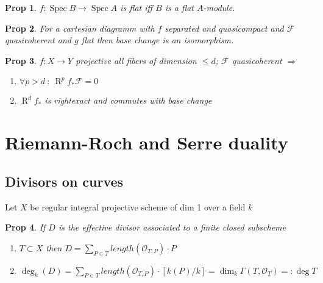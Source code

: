 \documentclass[a4paper, 12pt]{article}
\newcommand{\ca}[1]{\mathcal{#1}}
\newcommand{\caf}{\mathcal{F}}
\newtheorem*{prop}{Prop}
\DeclareMathOperator{\spec}{Spec}
\DeclareMathOperator{\R}{R}
\begin{document}
	\begin{prop}
		$ f: \spec B \rightarrow \spec A $ is flat iff $ B $ is a flat $ A $-module.
	\end{prop}
	
	\begin{prop}
		For a cartesian diagramm with $ f $ separated and quasicompact and $ \caf $ quasicoherent and $ g $ flat then base change is an isomorphism.
	\end{prop}
	
	\begin{prop}
		$ f:X \rightarrow Y $ projective all fibers of dimension $ \leq d $; $ \caf $ quasicoherent $ \Rightarrow $
		\begin{enumerate}
			\item $ \forall p> d \: : \: \R^p f_* \caf = 0 $
			\item $ \R^df_* $ is rightexact and commutes with base change
		\end{enumerate}
	\end{prop}
	
	
	

	\section{Riemann-Roch and Serre duality}
	

    \subsection{Divisors on curves}

        Let $X$ be regular integral projective scheme of dim 1 over a field $k$\\

	\begin{prop}
		If $ D $ is the effective divisor associated to a finite closed subscheme
		\begin{enumerate}
			\item $ T \subset X $ then $ D = \underset{P \in T}{\sum} length(\ca{O}_{T,P})\cdot P $
			\item $ \deg_k(D) = \underset{P \in T}{\sum} length(\ca{O}_{T,P})\cdot [k(P)/k] = \dim_k \Gamma(T, \ca{O}_T) =: \deg T $
		\end{enumerate}
	\end{prop}
	
\end{document}
